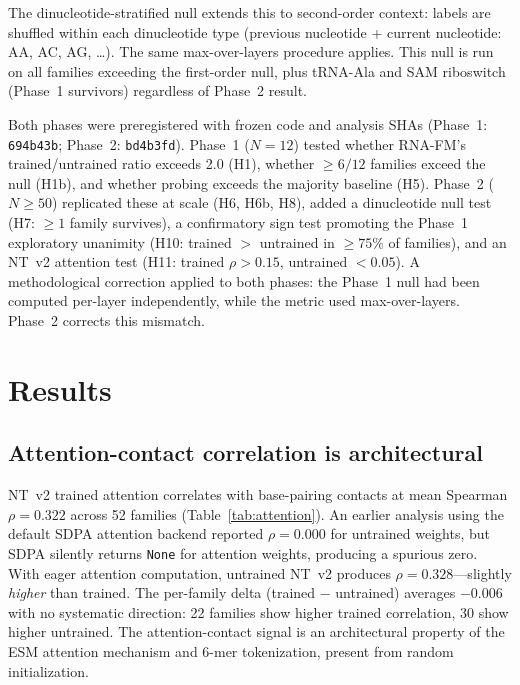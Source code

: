 \documentclass[11pt]{article}
\begin{document}
The dinucleotide-stratified null extends this to second-order context:
labels are shuffled within each dinucleotide type (previous nucleotide
+ current nucleotide: AA, AC, AG, \ldots).  The same max-over-layers
procedure applies.  This null is run on all families exceeding the
first-order null, plus tRNA-Ala and SAM riboswitch (Phase~1 survivors)
regardless of Phase~2 result.

Both phases were preregistered with frozen code and analysis SHAs
(Phase~1: \texttt{694b43b}; Phase~2: \texttt{bd4b3fd}).  Phase~1
($N = 12$) tested whether RNA-FM's trained/untrained ratio exceeds
2.0 (H1), whether $\geq 6/12$ families exceed the null (H1b), and
whether probing exceeds the majority baseline (H5).  Phase~2
($N \geq 50$) replicated these at scale (H6, H6b, H8), added a
dinucleotide null test (H7: $\geq 1$ family survives), a confirmatory
sign test promoting the Phase~1 exploratory unanimity (H10: trained
$>$ untrained in $\geq 75\%$ of families), and an NT~v2 attention
test (H11: trained $\rho > 0.15$, untrained $< 0.05$).  A
methodological correction applied to both phases: the Phase~1 null
had been computed per-layer independently, while the metric used
max-over-layers.  Phase~2 corrects this mismatch.


\section{Results}
\label{sec:results}

\subsection{Attention-contact correlation is architectural}
\label{sec:attn_results}

NT~v2 trained attention correlates with base-pairing contacts at mean
Spearman $\rho = 0.322$ across 52 families
(Table~\ref{tab:attention}).  An earlier analysis using the default
SDPA attention backend reported $\rho = 0.000$ for untrained weights,
but SDPA silently returns \texttt{None} for attention weights,
producing a spurious zero.  With eager attention computation,
untrained NT~v2 produces $\rho = 0.328$---slightly \emph{higher} than
trained.  The per-family delta (trained $-$ untrained) averages
$-0.006$ with no systematic direction: 22 families show higher trained
correlation, 30 show higher untrained.  The attention-contact signal
is an architectural property of the ESM attention mechanism and
6-mer tokenization, present from random initialization.
\end{document}
